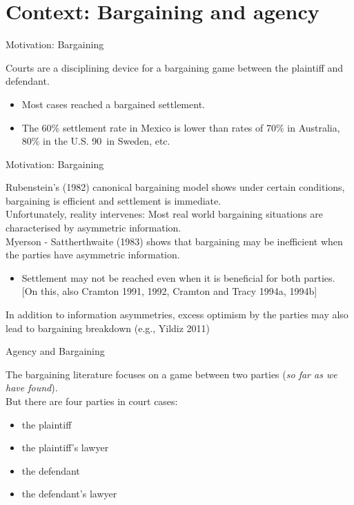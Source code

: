 \documentclass[9pt]{beamer}
\begin{document}
\section{Context: Bargaining and agency}

\begin{frame}{Motivation: Bargaining}

Courts are a disciplining device for a bargaining game between the plaintiff and defendant. 
   \begin{itemize}
       \item Most cases reached a bargained settlement. 
       \item The 60\% settlement rate in Mexico is lower than rates of 70\% in Australia, 80\% in the U.S. 90\ in Sweden, etc.  
   \end{itemize}
   
  \end{frame}
  
  
\begin{frame}{Motivation: Bargaining}

Rubenstein's (1982) canonical bargaining model shows under certain conditions, bargaining is efficient and settlement is immediate. \pause
\\
\vspace{.1in}
Unfortunately, reality intervenes: Most real world bargaining situations are characterised by asymmetric information. 
\vspace{.1in}
\\
Myerson - Sattherthwaite (1983) shows that bargaining may be inefficient when the parties have asymmetric information. 
    \begin{itemize}
        \item Settlement may not be reached even when it is beneficial for both parties. [On this, also Cramton 1991, 1992, Cramton and Tracy 1994a, 1994b]
    \end{itemize}
\pause
In addition to information asymmetries, excess optimism by the parties may also lead to bargaining breakdown (e.g., Yildiz 2011)

  
\end{frame}

\begin{frame}{Agency and Bargaining}

The bargaining literature focuses on a game between two parties (\textit{so far as we have found}). 
\\
\vspace{.1in}
But there are four parties in court cases:
\begin{itemize}
    \item the plaintiff
    \item the plaintiff's lawyer
    \item the defendant
    \item the defendant's lawyer
\end{itemize}
\vspace{.2in}
\end{frame}
\end{document}

